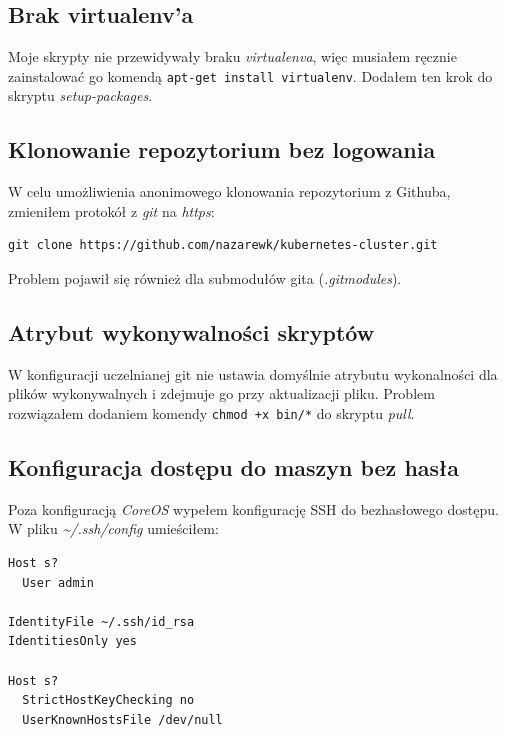 \documentclass[a4paper,12pt,twoside,openany]{report}
\newcommand{\passthrough}[1]{#1}
\begin{document}
\hypertarget{brak-virtualenva}{%
\subsection{Brak virtualenv'a}\label{brak-virtualenva}}

Moje skrypty nie przewidywały braku \emph{virtualenva}, więc musiałem
ręcznie zainstalować go komendą
\passthrough{\lstinline!apt-get install virtualenv!}. Dodałem ten krok
do skryptu \emph{setup-packages}.

\hypertarget{klonowanie-repozytorium-bez-logowania}{%
\subsection{Klonowanie repozytorium bez
logowania}\label{klonowanie-repozytorium-bez-logowania}}

W celu umożliwienia anonimowego klonowania repozytorium z Githuba,
zmieniłem protokół z \emph{git} na \emph{https}:

\begin{lstlisting}
git clone https://github.com/nazarewk/kubernetes-cluster.git
\end{lstlisting}

Problem pojawił się również dla submodułów gita (\emph{.gitmodules}).

\hypertarget{atrybut-wykonywalnoux15bci-skryptuxf3w}{%
\subsection{Atrybut wykonywalności
skryptów}\label{atrybut-wykonywalnoux15bci-skryptuxf3w}}

W konfiguracji uczelnianej git nie ustawia domyślnie atrybutu
wykonalności dla plików wykonywalnych i zdejmuje go przy aktualizacji
pliku. Problem rozwiązałem dodaniem komendy
\passthrough{\lstinline!chmod +x bin/*!} do skryptu \emph{pull}.

\hypertarget{konfiguracja-dostux119pu-do-maszyn-bez-hasux142a}{%
\subsection{Konfiguracja dostępu do maszyn bez
hasła}\label{konfiguracja-dostux119pu-do-maszyn-bez-hasux142a}}

Poza konfiguracją \emph{CoreOS} wypełem konfigurację SSH do bezhasłowego
dostępu. W pliku \emph{\textasciitilde{}/.ssh/config} umieściłem:

\begin{lstlisting}
Host s?
  User admin
  
IdentityFile ~/.ssh/id_rsa
IdentitiesOnly yes

Host s?
  StrictHostKeyChecking no
  UserKnownHostsFile /dev/null
\end{lstlisting}
\end{document}
